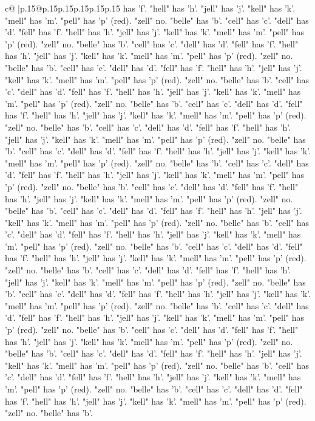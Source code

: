 \documentclass{article}
\begin{document}
{\begin{supertabular}{c@{$\;$}|p{.15\linewidth}@{}p{.15\linewidth}p{.15\linewidth}p{.15\linewidth}p{.15\linewidth}p{.15\linewidth}}
{{{has 'f'. "hell" has 'h'. "jell" has 'j'. "kell" has 'k'. "mell" has 'm'. "pell" has 'p' (red). "zell" no. "belle" has 'b'. "cell" has 'c'. "dell" has 'd'. "fell" has 'f'. "hell" has 'h'. "jell" has 'j'. "kell" has 'k'. "mell" has 'm'. "pell" has 'p' (red). "zell" no. "belle" has 'b'. "cell" has 'c'. "dell" has 'd'. "fell" has 'f'. "hell" has 'h'. "jell" has 'j'. "kell" has 'k'. "mell" has 'm'. "pell" has 'p' (red). "zell" no. "belle" has 'b'. "cell" has 'c'. "dell" has 'd'. "fell" has 'f'. "hell" has 'h'. "jell" has 'j'. "kell" has 'k'. "mell" has 'm'. "pell" has 'p' (red). "zell" no. "belle" has 'b'. "cell" has 'c'. "dell" has 'd'. "fell" has 'f'. "hell" has 'h'. "jell" has 'j'. "kell" has 'k'. "mell" has 'm'. "pell" has 'p' (red). "zell" no. "belle" has 'b'. "cell" has 'c'. "dell" has 'd'. "fell" has 'f'. "hell" has 'h'. "jell" has 'j'. "kell" has 'k'. "mell" has 'm'. "pell" has 'p' (red). "zell" no. "belle" has 'b'. "cell" has 'c'. "dell" has 'd'. "fell" has 'f'. "hell" has 'h'. "jell" has 'j'. "kell" has 'k'. "mell" has 'm'. "pell" has 'p' (red). "zell" no. "belle" has 'b'. "cell" has 'c'. "dell" has 'd'. "fell" has 'f'. "hell" has 'h'. "jell" has 'j'. "kell" has 'k'. "mell" has 'm'. "pell" has 'p' (red). "zell" no. "belle" has 'b'. "cell" has 'c'. "dell" has 'd'. "fell" has 'f'. "hell" has 'h'. "jell" has 'j'. "kell" has 'k'. "mell" has 'm'. "pell" has 'p' (red). "zell" no. "belle" has 'b'. "cell" has 'c'. "dell" has 'd'. "fell" has 'f'. "hell" has 'h'. "jell" has 'j'. "kell" has 'k'. "mell" has 'm'. "pell" has 'p' (red). "zell" no. "belle" has 'b'. "cell" has 'c'. "dell" has 'd'. "fell" has 'f'. "hell" has 'h'. "jell" has 'j'. "kell" has 'k'. "mell" has 'm'. "pell" has 'p' (red). "zell" no. "belle" has 'b'. "cell" has 'c'. "dell" has 'd'. "fell" has 'f'. "hell" has 'h'. "jell" has 'j'. "kell" has 'k'. "mell" has 'm'. "pell" has 'p' (red). "zell" no. "belle" has 'b'. "cell" has 'c'. "dell" has 'd'. "fell" has 'f'. "hell" has 'h'. "jell" has 'j'. "kell" has 'k'. "mell" has 'm'. "pell" has 'p' (red). "zell" no. "belle" has 'b'. "cell" has 'c'. "dell" has 'd'. "fell" has 'f'. "hell" has 'h'. "jell" has 'j'. "kell" has 'k'. "mell" has 'm'. "pell" has 'p' (red). "zell" no. "belle" has 'b'. "cell" has 'c'. "dell" has 'd'. "fell" has 'f'. "hell" has 'h'. "jell" has 'j'. "kell" has 'k'. "mell" has 'm'. "pell" has 'p' (red). "zell" no. "belle" has 'b'. "cell" has 'c'. "dell" has 'd'. "fell" has 'f'. "hell" has 'h'. "jell" has 'j'. "kell" has 'k'. "mell" has 'm'. "pell" has 'p' (red). "zell" no. "belle" has 'b'. "cell" has 'c'. "dell" has 'd'. "fell" has 'f'. "hell" has 'h'. "jell" has 'j'. "kell" has 'k'. "mell" has 'm'. "pell" has 'p' (red). "zell" no. "belle" has 'b'. "cell" has 'c'. "dell" has 'd'. "fell" has 'f'. "hell" has 'h'. "jell" has 'j'. "kell" has 'k'. "mell" has 'm'. "pell" has 'p' (red). "zell" no. "belle" has 'b'. "cell" has 'c'. "dell" has 'd'. "fell" has 'f'. "hell" has 'h'. "jell" has 'j'. "kell" has 'k'. "mell" has 'm'. "pell" has 'p' (red). "zell" no. "belle" has 'b'. "cell" has 'c'. "dell" has 'd'. "fell" has 'f'. "hell" has 'h'. "jell" has 'j'. "kell" has 'k'. "mell" has 'm'. "pell" has 'p' (red). "zell" no. "belle" has 'b'. }}}
\end{supertabular}}
\end{document}

